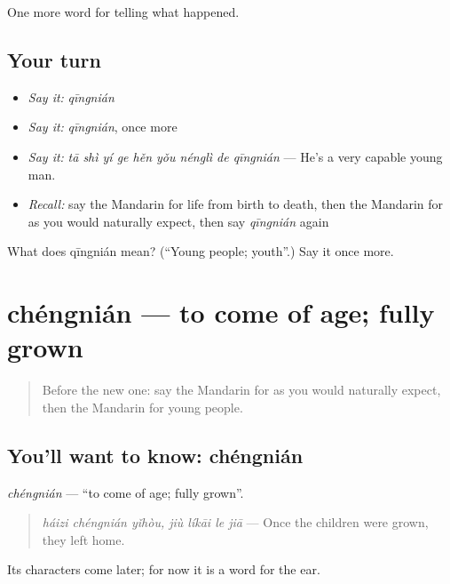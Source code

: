 \begin{grammarlens}[title={What you've built}]
One more word for telling what happened.
\end{grammarlens}

\subsection*{Your turn}
\begin{itemize}
\raggedright
  \item \emph{Say it:} \emph{qīngnián}
  \item \emph{Say it:} \emph{qīngnián}, once more
  \item \emph{Say it:} \emph{tā shì yí ge hěn yǒu nénglì de qīngnián} — He's a very capable young man.
  \item \emph{Recall:} say the Mandarin for life from birth to death, then the Mandarin for as you would naturally expect, then say \emph{qīngnián} again
\end{itemize}

\begin{tcolorbox}[breakable,colback=teal!4,colframe=teal!35!black,title={Before you move on}]
What does qīngnián mean? (\textquotedblleft{}Young people; youth\textquotedblright{}.) Say it once more.
\end{tcolorbox}
\section[chéngnián]{chéngnián — to come of age; fully grown}

\label{lesson:ZH-C317-chengnian}



\begin{quote}
Before the new one: say the Mandarin for as you would naturally expect, then the Mandarin for young people.
\end{quote}

\subsection*{You'll want to know: chéngnián}
\emph{chéngnián} — \textquotedblleft{}to come of age; fully grown\textquotedblright{}.

\begin{quote}
\emph{háizi chéngnián yǐhòu, jiù líkāi le jiā} — Once the children were grown, they left home.
\end{quote}

Its characters come later; for now it is a word for the ear.

